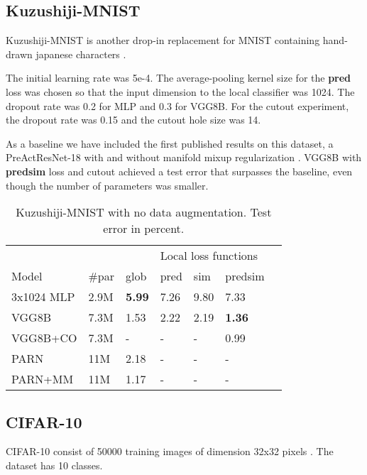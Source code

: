 \documentclass{article}
\begin{document}
\subsection{Kuzushiji-MNIST}

Kuzushiji-MNIST is another drop-in replacement for MNIST containing hand-drawn japanese characters \cite{Kuzushiji18}. 

The initial learning rate was 5e-4. The average-pooling kernel size for the \textbf{pred} loss was chosen so that the input dimension to the local classifier was 1024. The dropout rate was 0.2 for MLP and 0.3 for VGG8B. For the cutout experiment, the dropout rate was 0.15 and the cutout hole size was 14.

As a baseline we have included the first published results on this dataset, a PreActResNet-18 \cite{HeZRS16} with and without manifold mixup regularization \cite{Kuzushiji18}. VGG8B with \textbf{predsim} loss and cutout achieved a test error that surpasses the baseline, even though the number of parameters was smaller.

\begin{table}[h]
  \caption{Kuzushiji-MNIST with no data augmentation. Test error in percent.}
  \label{table:kmnist}
  \centering
  \begin{tabular}{lllllll}
    \toprule
    &&& \multicolumn{3}{|l}{Local loss functions} \\
    Model   & \#par & glob & \multicolumn{1}{|l}{pred} & sim & \multicolumn{1}{l}{predsim}  \\
    \midrule
    3x1024 MLP & 2.9M &  \textbf{5.99} & \multicolumn{1}{|l}{7.26} & 9.80  & 7.33 \\
    VGG8B      & 7.3M &  1.53 & \multicolumn{1}{|l}{2.22} & 2.19  & \textbf{1.36} \\
    VGG8B+CO   & 7.3M &  - & \multicolumn{1}{|l}{-} & -  & 0.99 \\
    \midrule
    PARN       & 11M & 2.18  & \multicolumn{1}{|l}{-} & - & - \\
    PARN+MM    & 11M & 1.17  & \multicolumn{1}{|l}{-} & - & - \\
    \bottomrule
  \end{tabular}
\end{table}

\subsection{CIFAR-10}

CIFAR-10 consist of 50000 training images of dimension 32x32 pixels \cite{Krizhevsky09}. The dataset has 10 classes.
\end{document}
